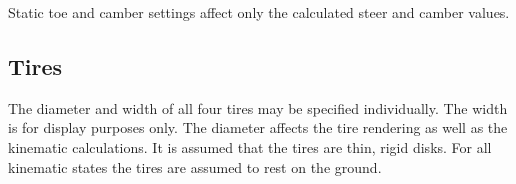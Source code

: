 Static toe and camber settings affect only the calculated steer and camber values.

\subsection{Tires} \label{ssec:tires}

The diameter and width of all four tires may be specified individually.  The width is for display purposes only.  The diameter affects the tire rendering as well as the kinematic calculations.  It is assumed that the tires are thin, rigid disks.  For all kinematic states the tires are assumed to rest on the ground.
